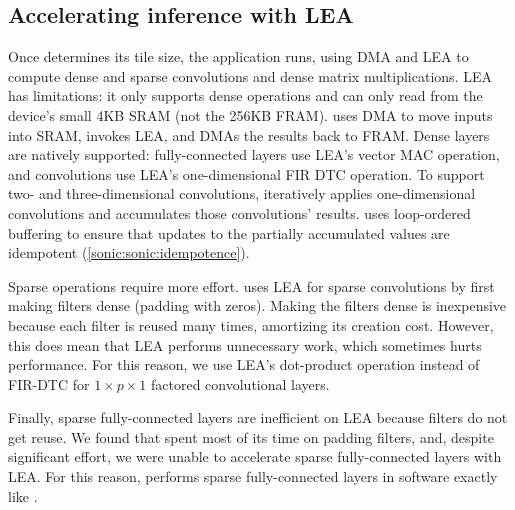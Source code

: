 \subsection{Accelerating inference with LEA}
Once \tails determines its tile size, the application runs, using DMA and LEA
to compute dense and sparse convolutions and dense matrix multiplications.  
%
LEA has limitations: it only supports dense operations
and can only read from the device's small 4KB SRAM (not the 256KB FRAM).
%
\tails uses DMA to move inputs into SRAM,
invokes LEA,
and DMAs the results back to FRAM.
%
Dense layers are natively supported:
fully-connected layers use LEA's vector MAC operation,
and convolutions use LEA's one-dimensional FIR DTC operation.
%
To support two- and three-dimensional convolutions, \tails iteratively 
applies one-dimensional convolutions and accumulates those convolutions' results. 
%
\tails uses loop-ordered buffering to ensure that updates to
the partially accumulated values are idempotent (\autoref{sonic:sonic:idempotence}).

Sparse operations require more effort.
%
\tails uses LEA for sparse convolutions by first making filters dense (padding with zeros).
%
Making the filters dense is inexpensive %
because each filter is reused many times, amortizing its creation cost.
%
However, %
this does mean that LEA performs unnecessary work, which sometimes hurts performance.
%
For this reason, we use LEA's dot-product operation instead of FIR-DTC for $1\times p\times 1$ factored convolutional layers.

Finally, sparse fully-connected layers are inefficient on LEA
because filters do not get reuse.
%
We found that \tails spent most of its time on padding filters,
and, despite significant effort, we were unable to accelerate sparse fully-connected layers with LEA.
%
For this reason, \tails performs sparse fully-connected layers in software
exactly like \sonic.
